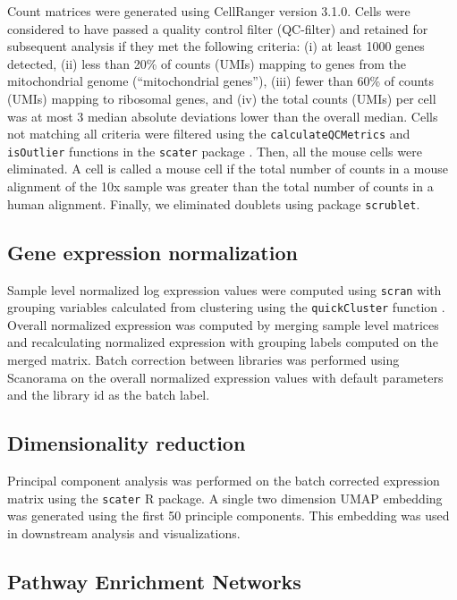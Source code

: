 Count matrices were generated using CellRanger version 3.1.0. Cells were considered to have passed a quality control filter (QC-filter) and retained for subsequent analysis if they met the following criteria: (i) at least 1000 genes detected, (ii) less than 20\% of counts (UMIs) mapping to genes from the mitochondrial genome (``mitochondrial genes''), (iii) fewer than 60\% of counts (UMIs) mapping to ribosomal genes, and (iv) the total counts (UMIs) per cell was at most 3 median absolute deviations lower than the overall median. Cells not matching all criteria were filtered using the \texttt{calculateQCMetrics} and \texttt{isOutlier} functions in the \texttt{scater} package \cite{mccarthy2017scater}. Then, all the mouse cells were eliminated. A cell is called a mouse cell if the total number of counts in a mouse alignment of the 10x sample was greater than the total number of counts in a human alignment. Finally, we eliminated doublets using package \texttt{scrublet}\cite{scrublet}.

\subsection{Gene expression normalization}

Sample level normalized log expression values were computed using \texttt{scran} \cite{lun2016pooling} with grouping variables calculated from clustering using the \texttt{quickCluster} function \cite{lun2016step}. Overall normalized expression was computed by merging sample level matrices and recalculating normalized expression with grouping labels computed on the merged matrix. Batch correction between libraries was performed using Scanorama \cite{hie2019efficient} on the overall normalized expression values with default parameters and the library id as the batch label.

\subsection{Dimensionality reduction}

Principal component analysis was performed on the batch corrected expression matrix using the \texttt{scater} \cite{mccarthy2017scater} R package.  A single two dimension UMAP \cite{becht2019dimensionality} embedding was generated using the first 50 principle components. This embedding was used in downstream analysis and visualizations.

\subsection{Pathway Enrichment Networks}


